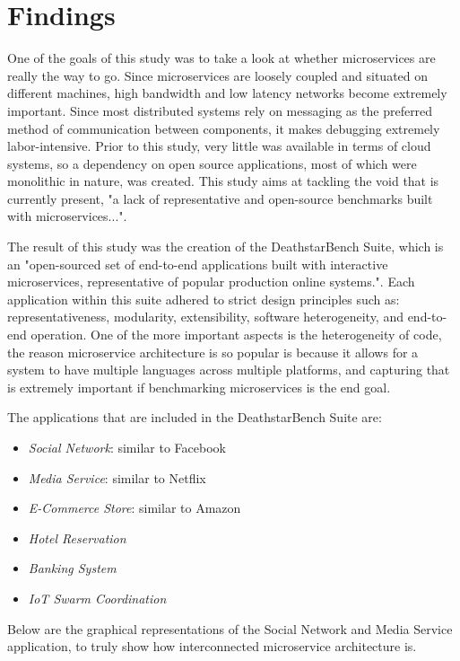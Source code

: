 \documentclass[12pt]{report}
\begin{document}
\section*{Findings}

One of the goals of this study was to take a look at whether microservices are really the way to go. Since microservices are loosely coupled and situated on different machines, high bandwidth and low latency networks become extremely important. Since most distributed systems rely on messaging as the preferred method of communication between components, it makes debugging extremely labor-intensive. Prior to this study, very little was available in terms of cloud systems, so a dependency on open source applications, most of which were monolithic in nature, was created. This study aims at tackling the void that is currently present, "a lack of representative and open-source benchmarks built with microservices..."\cite{article}. 

The result of this study was the creation of the DeathstarBench Suite, which is an "open-sourced set of end-to-end applications built with interactive microservices, representative of popular production online systems."\cite{article}. Each application within this suite adhered to strict design principles such as: representativeness, modularity, extensibility, software heterogeneity, and end-to-end operation. One of the more important aspects is the heterogeneity of code, the reason microservice architecture is so popular is because it allows for a system to have multiple languages across multiple platforms, and capturing that is extremely important if benchmarking microservices is the end goal.

The applications that are included in the DeathstarBench Suite are:
\begin{itemize}
    \item \textit{Social Network}: similar to Facebook
    \item \textit{Media Service}: similar to Netflix
    \item \textit{E-Commerce Store}: similar to Amazon
    \item \textit{Hotel Reservation}
    \item \textit{Banking System}
    \item \textit{IoT Swarm Coordination}
\end{itemize}

Below are the graphical representations of the Social Network and Media Service application, to truly show how interconnected microservice architecture is.
\end{document}
